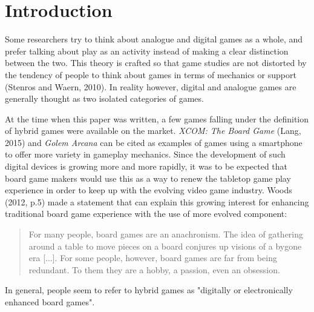 \chapter{Introduction}
Some researchers try to think about analogue and digital games as a whole, and prefer talking about play as an activity instead of making a clear distinction between the two. This theory is crafted so that game studies are not distorted by the tendency of people to think about games in terms of mechanics or support (Stenros and Waern, 2010)\cite{art:stenroswaern}. In reality however, digital and analogue games are generally thought as two isolated categories of games.

At the time when this paper was written, a few games falling under the definition of hybrid games were available on the market. \textit{XCOM: The Board Game} (Lang, 2015)\cite{game:xcomtbg} and \textit{Golem Arcana} can be cited as examples of games using a smartphone to offer more variety in gameplay mechanics. Since the development of such digital devices is growing more and more rapidly, it was to be expected that board game makers would use this as a way to renew the tabletop game play experience in order to keep up with the evolving video game industry. Woods (2012, p.5) \cite{book:euro} made a statement that can explain this growing interest for enhancing traditional board game experience with the use of more evolved component:

\begin{quotation}
For many people, board games are an anachronism. The idea of gathering around a table to move pieces on a board conjures up visions of a bygone era [...]. For some people, however, board games are far from being redundant. To them they are a hobby, a passion, even an obsession.
\end{quotation}

In general, people seem to refer to hybrid games as "digitally or electronically enhanced board games". 

